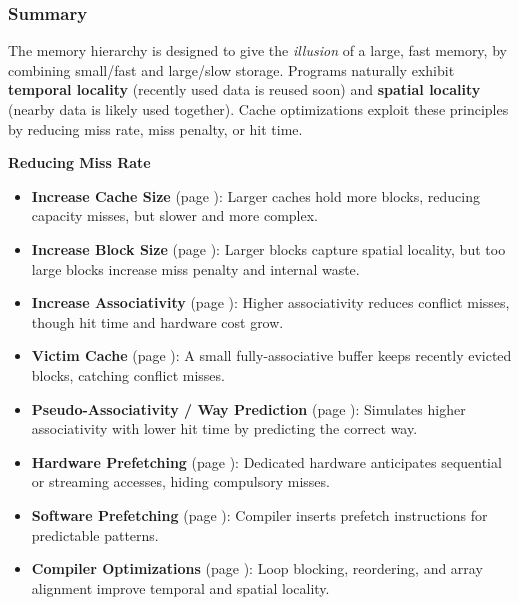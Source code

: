 \subsubsection{Summary}

The memory hierarchy is designed to give the \emph{illusion} of a large, fast memory, by combining small/fast and large/slow storage. Programs naturally exhibit \textbf{temporal locality} (recently used data is reused soon) and \textbf{spatial locality} (nearby data is likely used together). Cache optimizations exploit these principles by reducing miss rate, miss penalty, or hit time.

\highspace
\begin{flushleft}
    \textcolor{Green3}{ \textbf{Reducing Miss Rate}}
\end{flushleft}
\begin{itemize}
    \item \textbf{Increase Cache Size} (page \pageref{paragraph: Increasing Cache Size}): Larger caches hold more blocks, reducing capacity misses, but slower and more complex.
    \item \textbf{Increase Block Size} (page \pageref{paragraph: Increasing Block Size}): Larger blocks capture spatial locality, but too large blocks increase miss penalty and internal waste.
    \item \textbf{Increase Associativity} (page \pageref{paragraph: Increasing Associativity}): Higher associativity reduces conflict misses, though hit time and hardware cost grow.
    \item \textbf{Victim Cache} (page \pageref{paragraph: Victim Cache}): A small fully-associative buffer keeps recently evicted blocks, catching conflict misses.
    \item \textbf{Pseudo-Associativity / Way Prediction} (page \pageref{paragraph: Pseudo-Associativity and Way Prediction}): Simulates higher associativity with lower hit time by predicting the correct way.
    \item \textbf{Hardware Prefetching} (page \pageref{paragraph: Hardware Prefetching}): Dedicated hardware anticipates sequential or streaming accesses, hiding compulsory misses.
    \item \textbf{Software Prefetching} (page \pageref{paragraph: Software Prefetching}): Compiler inserts prefetch instructions for predictable patterns.
    \item \textbf{Compiler Optimizations} (page \pageref{paragraph: Compiler Optimizations}): Loop blocking, reordering, and array alignment improve temporal and spatial locality.
\end{itemize}

